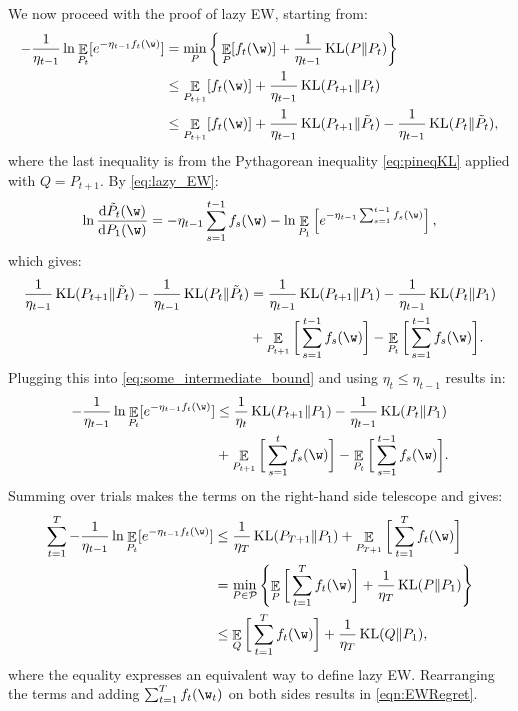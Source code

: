 \documentclass{colt2018} %
\DeclareMathOperator*{\E}{\mathbb{E}}
\DeclareMathOperator{\kl}{KL}
\newcommand{\domainP}{\mathcal{P}}
\newcommand{\der}{\mathrm{d}}                   %
\begin{document}
We now proceed with the proof of lazy EW,
% 
% 
starting from:
\begin{align}
  -\frac{1}{\eta_{t-1}}\ln \E_{P_t}[e^{-\eta_{t-1} f_t(\w)}]  
  &=\min_P\bigg\{ \E_P[f_t(\w)] + \frac{1}{\eta_{t-1}}\kl(P\|P_t) \bigg\} \nonumber \\
  & \leq \E_{P_{t+1}}[f_t(\w)] + \frac{1}{\eta_{t-1}}\kl(P_{t+1}\|P_t) \nonumber \\
  & \leq  \E_{P_{t+1}}[f_t(\w)] + \frac{1}{\eta_{t-1}}\kl(P_{t+1}\|\tilde{P}_t) - \frac{1}{\eta_{t-1}}\kl(P_{t}\|\tilde{P}_t),
\label{eq:some_intermediate_bound}
\end{align}
% 
where the last inequality is from the Pythagorean inequality
\eqref{eq:pineqKL} applied with $Q=P_{t+1}$. By \eqref{eq:lazy_EW}:
\[
  \ln \frac{\der \tilde{P}_t(\w)}{\der P_{1}(\w)} = - \eta_{t-1}
  \sum_{s=1}^{t-1} f_s(\w)
  - \ln \E_{P_1}\left[e^{-\eta_{t-1} \sum_{s=1}^{t-1} f_s(\w)}\right],
\]
which gives:
\begin{align*}
  \frac{1}{\eta_{t-1}}\kl(P_{t+1}\|\tilde{P}_t) - \frac{1}{\eta_{t-1}}\kl(P_{t}\|\tilde{P}_t)
  &=\frac{1}{\eta_{t-1}}\kl(P_{t+1}\|P_1) - \frac{1}{\eta_{t-1}}\kl(P_{t}\|P_1) \\
  &+ \E_{P_{t+1}}\bigg[\sum_{s=1}^{t-1} f_s(\w) \bigg] 
  - \E_{P_t}\bigg[\sum_{s=1}^{t-1} f_{s}(\w)\bigg].
\end{align*}
Plugging this into \eqref{eq:some_intermediate_bound} and using $\eta_{t} \leq \eta_{t-1}$ results in:
\begin{align*}
  -\frac{1}{\eta_{t-1}}\ln \E_{P_t}[e^{-\eta_{t-1} f_t(\w)}]  
  &\leq \frac{1}{\eta_t}\kl(P_{t+1}\|P_1) - \frac{1}{\eta_{t-1}}\kl(P_{t}\|P_1) \\
  &+ \E_{P_{t+1}}\bigg[\sum_{s=1}^{t} f_s(\w) \bigg] 
  - \E_{P_t}\bigg[\sum_{s=1}^{t-1} f_{s}(\w)\bigg].
\end{align*}
Summing over trials 
makes the terms on the right-hand side telescope and gives:
\begin{align*}
  \sum_{t=1}^T -\frac{1}{\eta_{t-1}}\ln \E_{P_t}[e^{-\eta_{t-1} f_t(\w)}]  
  &\leq \frac{1}{\eta_{T}} \kl(P_{T+1}\|P_1) + \E_{P_{T+1}}\bigg[ \sum_{t=1}^T f_t(\w) \bigg] \\
  &=\min_{P \in \domainP} \left\{\E_{P}\bigg[ \sum_{t=1}^T f_t(\w) \bigg]
+ \frac{1}{\eta_{T}} \kl(P\|P_1) \right\} \\
&\leq \E_{Q}\bigg[ \sum_{t=1}^T f_t(\w) \bigg] + \frac{1}{\eta_T} \kl(Q\|P_1),
\end{align*}
where the equality expresses an equivalent way to define lazy EW\@. 
Rearranging the terms 
and adding $\sum_{t=1}^T f_t(\w_t)$ on both sides results
in \eqref{eqn:EWRegret}.
\end{document}
